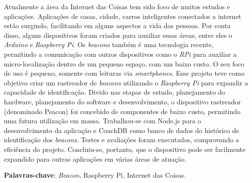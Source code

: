 \documentclass[
		12pt,				%
		openright,			%
		oneside,			%
		a4paper,			%
		chapter=TITLE,		%
		english,			%
		brazil				%
	]{abntex2}
\newif\iffinal
\newif\ifresumo
\begin{document}
\iffinal
	\begin{epigrafe}
		\vspace*{\fill}
			\begin{flushright}
			\textit{"Que eu não perca a vontade de ajudar as pessoas, \\
				mesmo sabendo que muitas delas são incapazes \\
				de ver, reconhecer e retribuir esta ajuda."\\
				(Francisco Cândido Xavier)}
		\end{flushright}
	\end{epigrafe}
\fi


\ifresumo
	\setlength{\absparsep}{18pt} %
	\begin{resumo}

		Atualmente a área da Internet das Coisas tem sido foco de muitos estudos e aplicações. Aplicações de casas, cidade, carros inteligentes conectados a internet estão surgindo, facilitando em alguns aspectos a vida das pessoas. Por conta disso, alguns dispositivos foram criados para auxiliar essas áreas, entre eles o \textit{Arduino} e \textit{Raspberry Pi}. Os \textit{beacons} também é uma tecnologia recente, permitindo a comunicação com outros dispositivos como o \textit{RPi} para auxiliar a micro-localização dentro de um pequeno espaço, com um baixo custo. O seu foco de uso é pequeno, somente com leituras via \textit{smartphones}. Esse projeto teve como objetivo criar um rastreador de \textit{beacons} utilizando o \textit{Raspberry Pi} para expandir a capacidade de identificação. Divido nas etapas de estudo, planejamento do hardware, planejamento do software e desenvolvimento, o dispositivo rastreador (denominado Peacon) foi concebido de componentes de baixo custo, permitindo uma futura utilização em massa. Trabalhou-se com Node.js para o desenvolvimento da aplicação e CouchDB como banco de dados do histórico de identificação dos \textit{beacons}. Testes e avaliações foram executados, comprovando a eficiência do projeto. Concluiu-se, portanto, que o dispositivo pode ser facilmente expandido para outras aplicações em várias áreas de atuação.

 			\textbf{Palavras-chave}: \textit{Beacon}, Raspberry Pi, Internet das Coisas.
 			
	\end{resumo}
	
\end{document}
